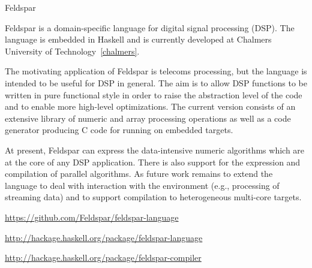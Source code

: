 \begin{hcarentry}{Feldspar}
\label{feldspar}
\makeheader

Feldspar is a domain-specific language for digital signal processing (DSP). The
language is embedded in Haskell and is currently developed at
Chalmers University of Technology~\cref{chalmers}.

The motivating application of Feldspar is telecoms processing, but the language
is intended to be useful for DSP in general. The aim is to allow DSP functions
to be written in pure functional style in order to raise the abstraction level of
the code and to enable more high-level optimizations. The current version consists
of an extensive library of numeric and array processing operations as well as a
code generator producing C code for running on embedded targets.

At present, Feldspar can express the data-intensive numeric algorithms which are
at the core of any DSP application. There is also support for the expression
and compilation of parallel algorithms. As future work remains to extend the language
to deal with interaction with the environment (e.g., processing of streaming data) and
to support compilation to heterogeneous multi-core targets.

\FurtherReading
\begin{compactitem}
\item \url{https://github.com/Feldspar/feldspar-language}
\item \url{http://hackage.haskell.org/package/feldspar-language}
\item \url{http://hackage.haskell.org/package/feldspar-compiler}
\end{compactitem}
\end{hcarentry}
